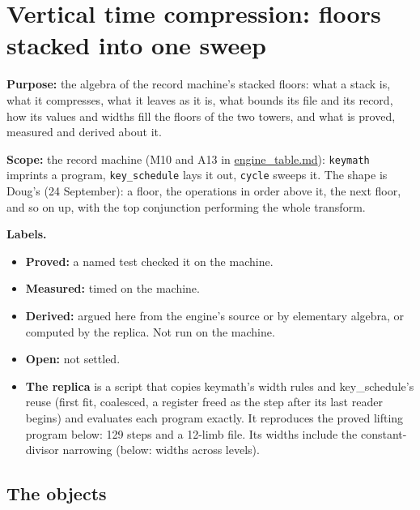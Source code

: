 \chapter{\texorpdfstring{Vertical time compression: floors stacked into one sweep}{Vertical time compression: floors stacked into one sweep}}
\label{chap:vertical-time-compression}

\textbf{Purpose:} the algebra of the record machine's stacked floors: what a stack is, what it compresses, what it leaves as it is, what bounds its file and its record, how its values and widths fill the floors of the two towers, and what is proved, measured and derived about it.

\textbf{Scope:} the record machine (M10 and A13 in \hyperref[chap:engine-table]{engine\_\allowbreak{}table.md}): \texttt{keymath} imprints a program, \texttt{key\_\allowbreak{}schedule} lays it out, \texttt{cycle} sweeps it. The shape is Doug's (24 September): a floor, the operations in order above it, the next floor, and so on up, with the top conjunction performing the whole transform.

\textbf{Labels.}

\begin{itemize}
\item \textbf{Proved:} a named test checked it on the machine.
\item \textbf{Measured:} timed on the machine.
\item \textbf{Derived:} argued here from the engine's source or by elementary algebra, or computed by the replica. Not run on the machine.
\item \textbf{Open:} not settled.
\item \textbf{The replica} is a script that copies keymath's width rules and key\_\allowbreak{}schedule's reuse (first fit, coalesced, a register freed as the step after its last reader begins) and evaluates each program exactly. It reproduces the proved lifting program below: 129 steps and a 12-limb file. Its widths include the constant-divisor narrowing (below: widths across levels).
\end{itemize}

\section{\texorpdfstring{The objects}{The objects}}

